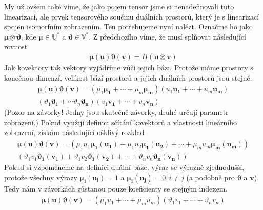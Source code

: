 \documentclass[a5paper,12pt]{amsbook}
\theoremstyle{definition}
\newcommand{\myvec}[1]{\bm{#1}}
\newcommand{\myspace}[1]{\mathbb{#1}}
\begin{document}
My už ovšem také víme, že jako pojem tensor jsme si nenadefinovali tuto linearizaci, ale prvek
tensorového součinu duálních prostorů, který je s linearizací spojen isomorfním zobrazením.
Ten potřebujeme nyní nalézt. Označme ho jako $\myvec{\mu}\otimes\myvec{\vartheta}$, kde
$\myvec{\mu}\in\myspace{U}^*$ a $\myvec{\vartheta}\in\myspace{V}^*$.
Z předchozího víme, že musí splňovat následující rovnost
\begin{equation*}
\begin{split}
\myvec{\mu}(\myvec{u})\myvec{\vartheta}(\myvec{v}) = H(\myvec{u}\otimes\myvec{v})
\end{split}
\end{equation*}
Jak kovektory tak vektory vyjádříme vůči jejich bázi. Protože máme prostory s konečnou dimenzí,
velikost bází prostorů a jejich duálních prostorů jsou stejné.
\begin{equation*}
\begin{split}
\myvec{\mu}(\myvec{u})\myvec{\vartheta}(\myvec{v}) =
(\mu_1\myvec{\mu_1} + \cdots + \mu_m\myvec{\mu_m})(u_1\myvec{u_1} + \cdots + u_m\myvec{u_m})\\
(\vartheta_1\myvec{\vartheta_1} + \cdots \vartheta_n\myvec{\vartheta_n})(v_1\myvec{v_1} 
  + \cdots + v_n\myvec{v_n})
\end{split}
\end{equation*}
(Pozor na závorky! Jedny jsou skutečně závorky, druhé určují parametr zobrazení.) Pokud využiji
definici sčítání kovektorů a vlastnosti lineárního zobrazení, získám následující ošklivý rozklad
\begin{equation*}
\begin{split}
\myvec{\mu}(\myvec{u})\myvec{\vartheta}(\myvec{v}) =
\left(\mu_1 u_1 \myvec{\mu_1}(\myvec{u_1}) + \mu_1 u_2 \myvec{\mu_1}(\myvec{u_2}) + \cdots 
  + \mu_m u_m \myvec{\mu_m}(\myvec{u_m})\right) \\
\left(\vartheta_1 v_1 \myvec{\vartheta_1}(\myvec{v_1}) + \vartheta_1 v_2 \myvec{\vartheta_1}(\myvec{v_2}) 
  + \cdots + \vartheta_n v_n \myvec{\vartheta_n}(\myvec{v_n})\right)
\end{split}
\end{equation*}
Pokud si vzpomeneme na definici duální báze, výraz se výrazně zjednodušší, protože všechny výrazy
$\myvec{\mu_i}(\myvec{u_i}) = 1$ a $\myvec{\mu_i}(\myvec{u_j}) = 0, i\neq j$ (a podobně pro
$\myvec{\vartheta}$ a $\myvec{v}$). Tedy nám v závorkách zůstanou pouze koeficienty se stejným indexem.
\begin{equation*}
\begin{split}
\myvec{\mu}(\myvec{u})\myvec{\vartheta}(\myvec{v}) =
  \left(\mu_1 u_1 + \cdots + \mu_m u_m \right)
  \left(\vartheta_1 v_1 + \cdots + \vartheta_n v_n \right)
\end{split}
\end{equation*}
\end{document}
